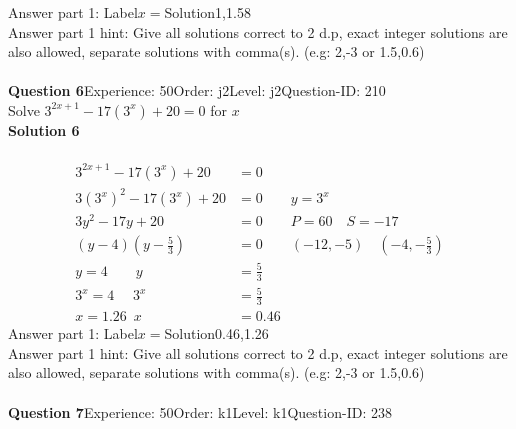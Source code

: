 \documentclass{article}
\begin{document}
Answer part 1: \hspace{10pt}Label\hspace{10pt}$x=$\hspace{10pt}Solution\hspace{10pt}1,1.58\\
Answer part 1 hint: \hspace{15pt} Give all solutions correct to 2 d.p, exact integer solutions are also allowed, separate solutions with comma(s). (e.g: 2,-3 or 1.5,0.6)\\
\\[4pt]
\noindent\textbf{Question 6}\hspace{20pt}Experience: 50\hspace{20pt}Order: j2\hspace{20pt}Level: j2\hspace{20pt}Question-ID: 210\\[2pt]
Solve $3^{2x+1}-17(3^x)+20=0$ for $x$\\[4pt]
\noindent\textbf{Solution 6}\\[2pt]
\\[-35pt]\begin{align*}
3^{2x+1}-17(3^x)+20&=0\\[2pt]
3(3^x)^2-17(3^x)+20&=0\qquad y=3^x\\[2pt]
3y^2-17y+20&=0\qquad P=60 \quad S=-17\\[2pt]
(y-4)\left(y-\displaystyle\frac{5}{3}\right)&=0\qquad (-12,-5)\quad \left(-4,-\displaystyle\frac{5}{3}\right)\\[2pt]
y=4 \qquad y&=\displaystyle\frac{5}{3}\\[2pt]
3^x=4\hspace{16pt} 3^x&=\displaystyle\frac{5}{3}\\[2pt]
x=1.26 \hspace{6pt} x&=0.46
\end{align*}
Answer part 1: \hspace{10pt}Label\hspace{10pt}$x=$\hspace{10pt}Solution\hspace{10pt}0.46,1.26\\
Answer part 1 hint: \hspace{15pt} Give all solutions correct to 2 d.p, exact integer solutions are also allowed, separate solutions with comma(s). (e.g: 2,-3 or 1.5,0.6)\\
\\[4pt]
\noindent\textbf{Question 7}\hspace{20pt}Experience: 50\hspace{20pt}Order: k1\hspace{20pt}Level: k1\hspace{20pt}Question-ID: 238\\[2pt]
\end{document}
